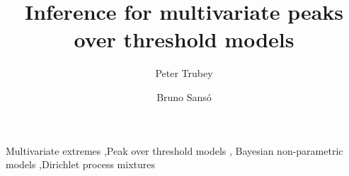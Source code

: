 \documentclass[12pt,authoryear]{elsarticle}
\title{Inference for multivariate peaks over threshold models}
\author{Peter Trubey}
\author{Bruno Sans\'o}
\begin{document}
\begin{abstract}
  
\end{abstract}

\begin{keyword}
 Multivariate extremes \sep Peak over threshold models \sep
 Bayesian non-parametric models \sep Dirichlet process mixtures
\end{keyword}

\maketitle













\end{document}
